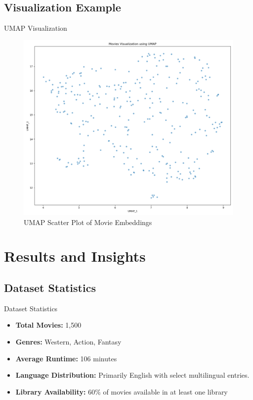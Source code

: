 \documentclass{beamer}
\begin{document}
\subsection{Visualization Example}
\begin{frame}{UMAP Visualization}
  \begin{figure}
    \centering
    \includegraphics[width=0.8\linewidth]{umap_plot.png}
    \caption{UMAP Scatter Plot of Movie Embeddings}
  \end{figure}
\end{frame}

\section{Results and Insights}
\subsection{Dataset Statistics}
\begin{frame}{Dataset Statistics}
  \begin{itemize}
    \item \textbf{Total Movies:} 1,500
    \item \textbf{Genres:} Western, Action, Fantasy
    \item \textbf{Average Runtime:} 106 minutes
    \item \textbf{Language Distribution:} Primarily English with select multilingual entries.
    \item \textbf{Library Availability:} 60\% of movies available in at least one library
  \end{itemize}
\end{frame}
\end{document}
